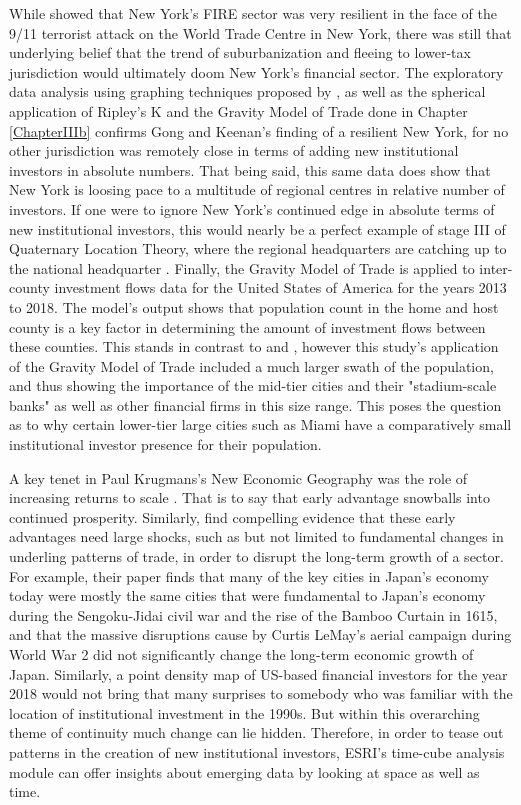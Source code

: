While \cite{gongthe2012} showed that New York's FIRE sector was very resilient in the face of the 9/11 terrorist attack on the World Trade Centre in New York, there was still that underlying belief that the trend of suburbanization and fleeing to lower-tax jurisdiction would ultimately doom New York's financial sector.  The exploratory data analysis using graphing techniques proposed by  \cite{tufte1998visual}, as well as the spherical application of Ripley's K and the Gravity Model of Trade done in Chapter \ref{ChapterIIIb} confirms Gong and Keenan's finding of a resilient New York, for no other jurisdiction was remotely close in terms of adding new institutional investors in absolute numbers.  That being said, this same data does show that New York is loosing pace to a multitude of regional centres in relative number of investors.  If one were to ignore New York's continued edge in absolute terms of new institutional investors, this would nearly be a perfect example of  stage III of Quaternary Location Theory, where the regional headquarters are catching up to the national headquarter \citep{Semple_Phipps82}.  Finally, the Gravity Model of Trade is applied to inter-county investment flows data for the United States of America for the years 2013 to 2018.  The model's output shows that population count in the home and host county is a key factor in determining the amount of investment flows between these counties.  This stands in contrast to \cite{greena1993} and \cite{GreenOLef2014}, however this study's application of the Gravity Model of Trade included a much larger swath of the population, and thus showing the importance of the mid-tier cities and their "stadium-scale banks" as well as other financial firms in this size range. This poses the question as to why certain lower-tier large cities such as Miami have a comparatively small institutional investor presence for their population.  

A key tenet in Paul Krugmans's New Economic Geography was the role of increasing returns to scale \citep{krugman1991increasing}.  That is to say that early advantage snowballs into continued prosperity.  Similarly, \cite{davis2002bones} find compelling evidence that these early advantages need large shocks, such as but not limited to fundamental changes in underling patterns of trade, in order to disrupt the long-term growth of a sector.  For example, their paper finds that many of the key cities in Japan's economy today were mostly the same cities that were fundamental to Japan's economy during the Sengoku-Jidai civil war and the rise of the Bamboo Curtain in 1615, and that the massive disruptions cause by Curtis LeMay's aerial campaign during World War 2 did not significantly change the long-term economic growth of Japan.  Similarly, a point density map of US-based financial investors for the year 2018 would not bring that many surprises to somebody who was familiar with the location of institutional investment in the 1990s.  But within this overarching theme of continuity much change can lie hidden.  Therefore, in order to tease out patterns in the creation of new institutional investors, ESRI's time-cube analysis module can offer insights about emerging data by looking at space as well as time. 

